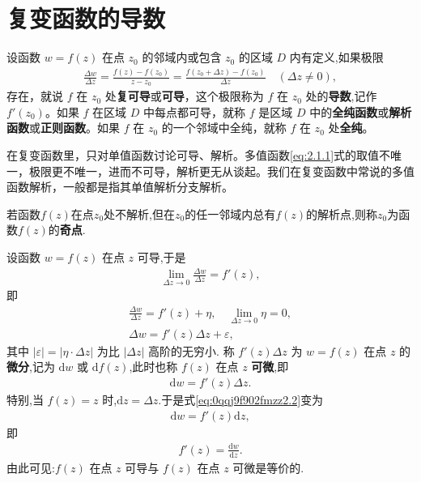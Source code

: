 \documentclass[../../main.tex]{subfiles}%
\begin{document}
\section{复变函数的导数}

\begin{definition}
设函数 $w = f(z)$ 在点 $z_0$ 的邻域内或包含 $z_0$ 的区域 $D$ 内有定义,如果极限
\begin{align}
\frac{\Delta w}{\Delta z} = \frac{f(z) - f(z_0)}{z - z_0} = \frac{f(z_0 + \Delta z) - f(z_0)}{\Delta z} \quad (\Delta z \neq 0),
\label{eq:2.1.1}
\end{align}
存在，就说 \( f \) 在 \( z_0 \) 处\textbf{复可导}或\textbf{可导}，这个极限称为 \( f \) 在 \( z_0 \) 处的\textbf{导数},记作 \( f'(z_0) \)。如果 \( f \) 在区域 \( D \) 中每点都可导，就称 \( f \) 是区域 \( D \) 中的\textbf{全纯函数}或\textbf{解析函数}或\textbf{正则函数}。如果 \( f \) 在 \( z_0 \) 的一个邻域中全纯，就称 \( f \) 在 \( z_0 \) 处\textbf{全纯}。
\end{definition}
\begin{remark}
在复变函数里，只对单值函数讨论可导、解析。多值函数\eqref{eq:2.1.1}式的取值不唯一，极限更不唯一，进而不可导，解析更无从谈起。我们在复变函数中常说的多值函数解析，一般都是指其单值解析分支解析。
\end{remark}

\begin{definition}
若函数$f(z)$在点$z_0$处不解析,但在$z_0$的任一邻域内总有$f(z)$的解析点,则称$z_0$为函数$f(z)$的\textbf{奇点}.
\end{definition}

\begin{definition}
设函数 $w = f(z)$ 在点 $z$ 可导,于是
\begin{align*}
\lim_{\Delta z \to 0} \frac{\Delta w}{\Delta z} = f'(z),
\end{align*}
即
\begin{gather*}
\frac{\Delta w}{\Delta z} = f'(z) + \eta, \quad \lim_{\Delta z \to 0} \eta = 0, \\
\Delta w = f'(z)\Delta z + \varepsilon,
\end{gather*}
其中 $|\varepsilon| = |\eta \cdot \Delta z|$ 为比 $|\Delta z|$ 高阶的无穷小.
称 $f'(z)\Delta z$ 为 $w = f(z)$ 在点 $z$ 的\textbf{微分},记为 $\mathrm{d}w$ 或 $\mathrm{d}f(z)$,此时也称 $f(z)$ 在点 $z$ \textbf{可微},即
\begin{align}
\mathrm{d}w = f'(z)\Delta z. \label{eq:0qqj9f902fmzz2.2}
\end{align}
特别,当 $f(z) = z$ 时,$\mathrm{d}z = \Delta z$.于是式\eqref{eq:0qqj9f902fmzz2.2}变为
\begin{align*}
\mathrm{d}w = f'(z)\mathrm{d}z,
\end{align*}
即
\begin{align*}
f'(z) = \frac{\mathrm{d}w}{\mathrm{d}z}.
\end{align*}
由此可见:$f(z)$ 在点 $z$ 可导与 $f(z)$ 在点 $z$ 可微是等价的.
\end{definition}
\end{document}
